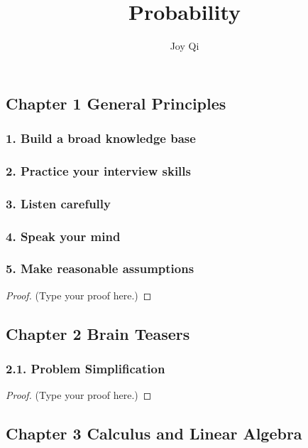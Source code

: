 \documentclass[12pt]{article}
\title{Probability}
\author{Joy Qi}
\begin{document}
\maketitle

\vspace{0.5in}



\subsection*{Chapter 1 General Principles}
\subsubsection*{1. Build a broad knowledge base}
\subsubsection*{2. Practice your interview skills}
\subsubsection*{3. Listen carefully}
\subsubsection*{4. Speak your mind}
\subsubsection*{5. Make reasonable assumptions}
\begin{proof}
(Type your proof here.)
\end{proof}

\vspace{2in} %


\subsection*{Chapter 2 Brain Teasers}
\subsubsection*{2.1. Problem Simplification}
\begin{proof}
(Type your proof here.)
\end{proof}
\subsection*{Chapter 3 Calculus and Linear Algebra}
\end{document}
